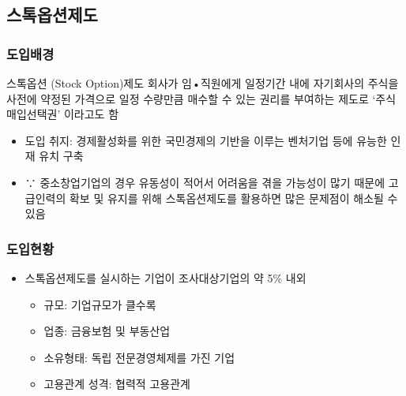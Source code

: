 \documentclass[aspectratio=169,xcolor=dvipsnames,handout]{beamer}
\begin{document}
\subsection{스톡옵션제도}%

\begin{frame}[allowframebreaks]
    \frametitle{도입배경}
    \begin{block}{스톡옵션 (Stock Option)제도} 
        회사가 임•직원에게 일정기간 내에 자기회사의 주식을 사전에 약정된 가격으로 일정 수량만큼 매수할 수 있는 권리를 부여하는 제도로 `주식매입선택권' 이라고도 함
    \end{block}
    \begin{itemize}[<+->]
        \item 도입 취지: 경제활성화를 위한 국민경제의 기반을 이루는 벤처기업 등에 유능한 인재 유치 구축
        \item ∵ 중소창업기업의 경우 유동성이 적어서 어려움을 겪을 가능성이 많기 때문에 고급인력의 확보 및 유지를 위해 스톡옵션제도를 활용하면 많은 문제점이 해소될 수 있음
    \end{itemize}
\end{frame}

\begin{frame}[allowframebreaks]
    \frametitle{도입현황}
    \begin{itemize}[<+->]
        \item 스톡옵션제도를 실시하는 기업이 조사대상기업의 약 5\% 내외
        \begin{itemize}[<+->]
            \item 규모: 기업규모가 클수록
            \item 업종: 금융보험 및 부동산업
            \item 소유형태: 독립 전문경영체제를 가진 기업
            \item 고용관계 성격: 협력적 고용관계
        \end{itemize}
    \end{itemize}
\end{frame}



\end{document}
